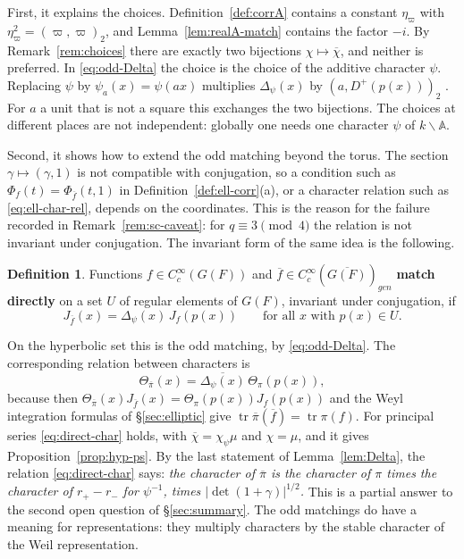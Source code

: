 \documentclass[12pt,letterpaper,openany]{book}
\theoremstyle{plain}
\theoremstyle{definition}
\newtheorem{definition}[theorem]{Definition}
\theoremstyle{remark}
\theoremstyle{remark}
\newcommand{\tr}{\operatorname{tr}}
\begin{document}
First, it explains the choices. Definition~\ref{def:corrA} contains a
constant $\eta_\varpi$ with $\eta_\varpi^2=(\varpi,\varpi)_2$, and
Lemma~\ref{lem:realA-match} contains the factor $-i$. By
Remark~\ref{rem:choices} there are exactly two bijections
$\chi\mapsto\overline\chi$, and neither is preferred. In
\eqref{eq:odd-Delta} the choice is the choice of the additive character
$\psi$. Replacing $\psi$ by $\psi_a(x)=\psi(ax)$ multiplies
$\Delta_\psi(x)$ by $(a,D^+(p(x)))_2$ \cite[Lemma~7.3(d)]{JC}. For $a$ a
unit that is not a square this exchanges the two bijections. The choices
at different places are not independent: globally one needs one
character $\psi$ of $k\backslash{\mathbb A}$.

Second, it shows how to extend the odd matching beyond the torus. The
section $\gamma\mapsto(\gamma,1)$ is not compatible with conjugation, so
a condition such as $\Phi_f(t)=\Phi_{\overline f}(t,1)$ in
Definition~\ref{def:ell-corr}(a), or a character relation such as
\eqref{eq:ell-char-rel}, depends on the coordinates. This is the
reason for the failure recorded in Remark~\ref{rem:sc-caveat}: for
$q\equiv3\pmod4$ the relation is not invariant under conjugation. The
invariant form of the same idea is the following.

\begin{definition}\label{def:direct}
Functions $f\in C_c^\infty(G(F))$ and
$\overline f\in C_c^\infty(\overline{G(F)})_{gen}$ \textbf{match directly}
on a set $U$ of regular elements of $G(F)$, invariant under conjugation,
if
\[
J_{\overline f}(x)=\Delta_\psi(x)\,J_f(p(x))\qquad\text{for all }x\text{ with }
p(x)\in U .
\]
\end{definition}

On the hyperbolic set this is the odd matching, by \eqref{eq:odd-Delta}.
The corresponding relation between characters is
\begin{equation}\label{eq:direct-char}
\Theta_{\overline\pi}(x)=\overline{\Delta_\psi(x)}\,\Theta_\pi(p(x)),
\end{equation}
because then $\Theta_{\overline\pi}(x)J_{\overline f}(x)=\Theta_\pi(p(x))
J_f(p(x))$ and the Weyl integration formulas of \S\ref{sec:elliptic}
give $\tr\overline\pi(\overline f)=\tr\pi(f)$. For principal series
\eqref{eq:direct-char} holds, with $\overline\chi=\chi_\psi\mu$ and
$\chi=\mu$, and it gives Proposition~\ref{prop:hyp-ps}. By the last
statement of Lemma~\ref{lem:Delta}, the relation \eqref{eq:direct-char}
says: \emph{the character of $\overline\pi$ is the character of $\pi$
times the character of $r_+-r_-$ for $\psi^{-1}$, times
$|\det(1+\gamma)|^{1/2}$.} This is a partial answer to the second open
question of \S\ref{sec:summary}. The odd matchings do have a meaning for
representations: they multiply characters by the stable character of the
Weil representation.
\end{document}
